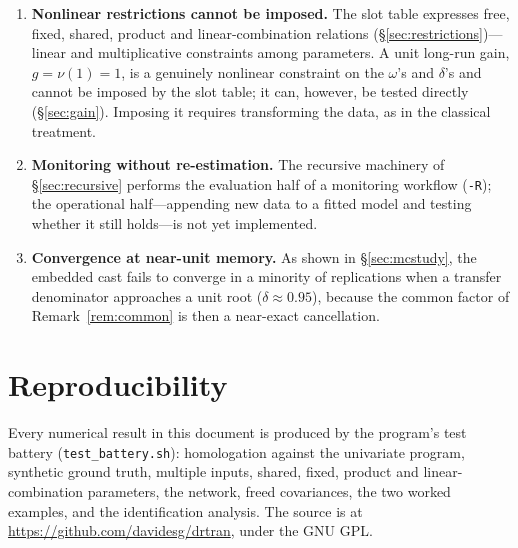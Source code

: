 \documentclass[11pt,a4paper]{article}
\theoremstyle{plain}
\theoremstyle{remark}
\begin{document}
\begin{enumerate}
\item \textbf{Nonlinear restrictions cannot be imposed.} The slot table expresses
  free, fixed, shared, product and linear-combination relations
  (\S\ref{sec:restrictions})---linear and multiplicative constraints among
  parameters. A unit long-run gain, $g=\nu(1)=1$, is a genuinely nonlinear
  constraint on the $\omega$'s and $\delta$'s and cannot be imposed by the slot
  table; it can, however, be tested directly (\S\ref{sec:gain}). Imposing it
  requires transforming the data, as in the classical treatment.


\item \textbf{Monitoring without re-estimation.} The recursive machinery of
  \S\ref{sec:recursive} performs the evaluation half of a monitoring workflow
  (\texttt{-R}); the operational half---appending new data to a fitted model and
  testing whether it still holds---is not yet implemented.

\item \textbf{Convergence at near-unit memory.} As shown in \S\ref{sec:mcstudy},
  the embedded cast fails to converge in a minority of replications when a transfer
  denominator approaches a unit root ($\delta\approx0.95$), because the common factor
  of Remark~\ref{rem:common} is then a near-exact cancellation.
\end{enumerate}

\section*{Reproducibility}

Every numerical result in this document is produced by the program's test battery
(\texttt{test\_battery.sh}): homologation against the univariate program, synthetic
ground truth, multiple inputs, shared, fixed, product and linear-combination
parameters, the network, freed covariances, the two worked examples, and the
identification analysis. The source is at
\url{https://github.com/davidesg/drtran}, under the GNU GPL.
\end{document}
